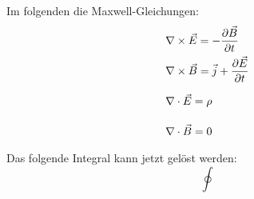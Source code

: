 \documentclass{scrartcl}
\begin{document}
Im folgenden die Maxwell-Gleichungen:
\begin{align}
&\nabla \times \vec{E} = - \frac{\partial \vec{B}}{\partial t}
\\
&\nabla \times \vec{B} = \vec{j} + \frac{\partial \vec{E}}{\partial t}
\\
&\nabla \cdot \vec{E} = \rho \vphantom{\frac{\partial \vec{E}}{\partial t}} %
\\
&\nabla \cdot \vec{B} = 0 \vphantom{\frac{\partial \vec{E}}{\partial t}}
\end{align}
Das folgende Integral kann jetzt gelöst werden:
\begin{equation}
\oint 
\end{equation}  
	
\end{document}

